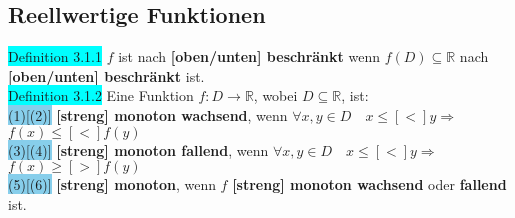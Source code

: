 \documentclass[landscape, 10pt]{article}
\newcommand{\R}{\mathbb{R}}
\begin{document}
\begin{multicols}{3}
       \subsection{Reellwertige Funktionen}
              \colorbox{cyan}{Definition 3.1.1} 
                     $f$ ist nach 
                     \textbf{[oben/unten] beschränkt} wenn 
                     \textcolor{NavyBlue}{$f(D)\subseteq\R$} 
                     nach \textbf{[oben/unten] beschränkt} ist.\\
              \colorbox{cyan}{Definition 3.1.2} 
                     Eine Funktion $f:D\longrightarrow\R$, wobei 
                     $D\subseteq\R$, ist:\\
                     \colorbox{SkyBlue}{(1)[(2)]}
                            \textbf{[streng] monoton 
                            wachsend}, wenn \textcolor{NavyBlue}{
                            $\forall x,y\in D\quad x\leqslant [<]y\Rightarrow$
                            $f(x)\leqslant [<]f(y)$} \\
                     \colorbox{SkyBlue}{(3)[(4)]}
                            \textbf{[streng] monoton 
                            fallend}, wenn \textcolor{NavyBlue}{
                            $\forall x,y\in D\quad x\leqslant [<]y\Rightarrow$
                            $f(x)\geqslant [>]f(y)$} \\
                     \colorbox{SkyBlue}{(5)[(6)]} 
                            \textbf{[streng] monoton}, 
                            wenn \textcolor{NavyBlue}{$f$} 
                            \textbf{[streng] monoton wachsend} oder 
                            \textbf{fallend} ist.\\

\end{multicols}
\end{document}
